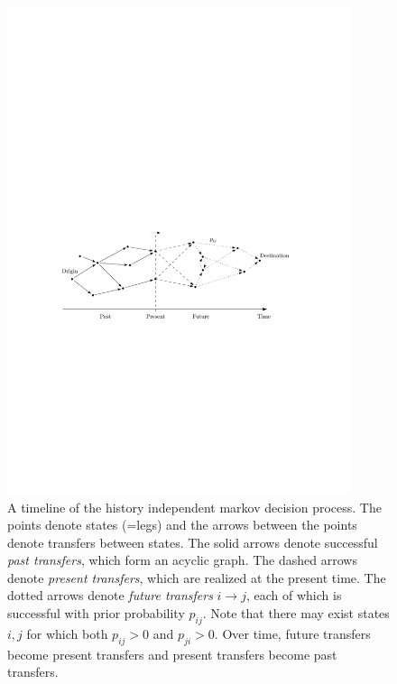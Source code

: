 \documentclass[dissertation,draft*]{aaltoseries}
\begin{document}
\begin{figure}[ht]
\begin{center}
\includegraphics[width=0.9\textwidth]{randomgraph}
\end{center}
\caption{A timeline of the history independent markov decision process. The points denote states (=legs) and the arrows
between the points denote transfers between states. The solid arrows denote
successful \emph{past transfers}, which
form an acyclic graph. The dashed arrows denote \emph{present transfers}, which are realized
at the present time. The dotted arrows denote \emph{future transfers} $i\to j$, each
of which is successful with prior probability $p_{ij}$. Note that there may exist 
states $i,j$ for which both $p_{ij}>0$ and $p_{ji}>0$. Over time, 
future transfers become present transfers and present transfers become
past transfers.
}
\label{randomgraph}
\end{figure}
\end{document}
